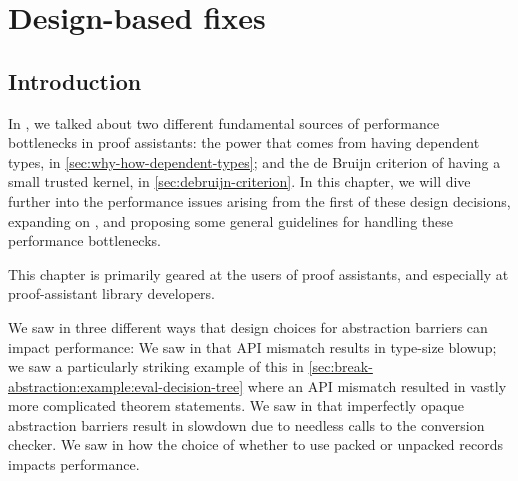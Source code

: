 \chapter{Design-based fixes} \label{ch:design} \label{ch:api-design}


\section{Introduction}
In , we talked about two different fundamental sources of performance bottlenecks in proof assistants:
the power that comes from having dependent types, in \autoref{sec:why-how-dependent-types};
and the de Bruijn criterion of having a small trusted kernel, in \autoref{sec:debruijn-criterion}.
In this chapter, we will dive further into the performance issues arising from the first of these design decisions, expanding on , and proposing some general guidelines for handling these performance bottlenecks.

This chapter is primarily geared at the users of proof assistants, and especially at proof-assistant library developers.

We saw in  three different ways that design choices for abstraction barriers can impact performance:
We saw in  that API mismatch results in type-size blowup; we saw a particularly striking example of this in \autoref{sec:break-abstraction:example:eval-decision-tree} where an API mismatch resulted in vastly more complicated theorem statements.
We saw in  that imperfectly opaque abstraction barriers result in slowdown due to needless calls to the conversion checker.
We saw in  how the choice of whether to use packed or unpacked records impacts performance.

